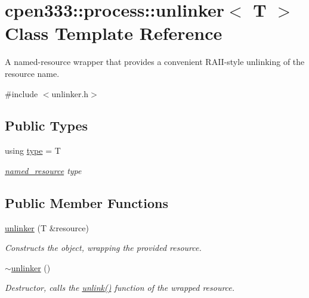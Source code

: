 \hypertarget{classcpen333_1_1process_1_1unlinker}{}\section{cpen333\+:\+:process\+:\+:unlinker$<$ T $>$ Class Template Reference}
\label{classcpen333_1_1process_1_1unlinker}


A named-\/resource wrapper that provides a convenient R\+A\+I\+I-\/style unlinking of the resource name.  




{\ttfamily \#include $<$unlinker.\+h$>$}

\subsection*{Public Types}
\begin{DoxyCompactItemize}
\item 
\mbox{\label{classcpen333_1_1process_1_1unlinker_a124c3197018db7eccfedab4c6ee04827}} 
using \hyperlink{classcpen333_1_1process_1_1unlinker_a124c3197018db7eccfedab4c6ee04827}{type} = T
\begin{DoxyCompactList}\small\item\em \hyperlink{classcpen333_1_1process_1_1named__resource}{named\+\_\+resource} type \end{DoxyCompactList}\end{DoxyCompactItemize}
\subsection*{Public Member Functions}
\begin{DoxyCompactItemize}
\item 
\hyperlink{classcpen333_1_1process_1_1unlinker_a44039679bd9939254fc53a5e876d8b8c}{unlinker} (T \&resource)
\begin{DoxyCompactList}\small\item\em Constructs the object, wrapping the provided resource. \end{DoxyCompactList}\item 
\mbox{\label{classcpen333_1_1process_1_1unlinker_a1b402f30b9cde1ed09252db7521a1bc2}} 
\hyperlink{classcpen333_1_1process_1_1unlinker_a1b402f30b9cde1ed09252db7521a1bc2}{$\sim$unlinker} ()
\begin{DoxyCompactList}\small\item\em Destructor, calls the {\ttfamily \hyperlink{classcpen333_1_1process_1_1unlinker_a00dd4ad138a95aa0173f81fd83c3210e}{unlink()}} function of the wrapped resource. \end{DoxyCompactList}\end{DoxyCompactItemize}
